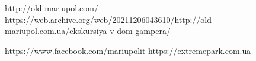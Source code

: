  
 
 
 
 

http://old-mariupol.com/
https://web.archive.org/web/20211206043610/http://old-mariupol.com.ua/ekskursiya-v-dom-gampera/

https://www.facebook.com/mariupolit
https://extremepark.com.ua
